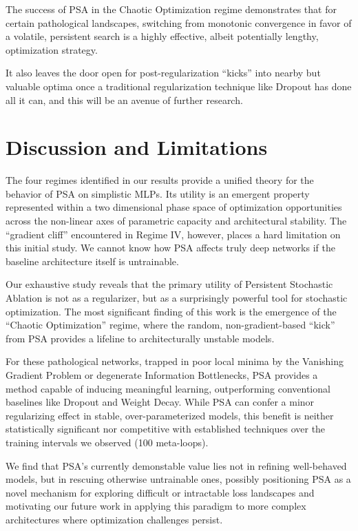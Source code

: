 \documentclass[conference]{IEEEtran}
\begin{document}
The success of PSA in the Chaotic Optimization regime demonstrates that for certain pathological landscapes, switching from monotonic convergence in favor of a volatile, persistent search is a highly effective, albeit potentially lengthy, optimization strategy.

It also leaves the door open for post-regularization ``kicks'' into nearby but valuable optima once a traditional regularization technique like Dropout has done all it can, and this will be an avenue of further research.

\section{Discussion and Limitations}
The four regimes identified in our results provide a unified theory for the behavior of PSA on simplistic MLPs. Its utility is an emergent property represented within a two dimensional phase space of optimization opportunities across the non-linear axes of parametric capacity and architectural stability. The ``gradient cliff'' encountered in Regime IV, however, places a hard limitation on this initial study. We cannot know how PSA affects truly deep networks if the baseline architecture itself is untrainable.

Our exhaustive study reveals that the primary utility of Persistent Stochastic Ablation is not as a regularizer, but as a surprisingly powerful tool for stochastic optimization. The most significant finding of this work is the emergence of the ``Chaotic Optimization'' regime, where the random, non-gradient-based ``kick'' from PSA provides a lifeline to architecturally unstable models.

For these pathological networks, trapped in poor local minima by the Vanishing Gradient Problem or degenerate Information Bottlenecks, PSA provides a method capable of inducing meaningful learning, outperforming conventional baselines like Dropout and Weight Decay. While PSA can confer a minor regularizing effect in stable, over-parameterized models, this benefit is neither statistically significant nor competitive with established techniques over the training intervals we observed (100 meta-loops).

We find that PSA's currently demonstable value lies not in refining well-behaved models, but in rescuing otherwise untrainable ones, possibly positioning PSA as a novel mechanism for exploring difficult or intractable loss landscapes and motivating our future work in applying this paradigm to more complex architectures where optimization challenges persist.
\end{document}
